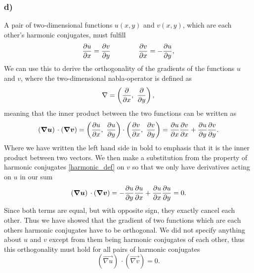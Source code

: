 \documentclass[12pt,twoside]{article}
\begin{document}
\subsubsection*{d)}
A pair of two-dimensional functions $u(x, y)$ and $v(x, y)$, which are each other's harmonic conjugates, must fulfill
\begin{equation}
  \pdv{u}{x} = \pdv{v}{y} \qquad \qquad \pdv{v}{x} = - \pdv{u}{y}, \label{harmonic_def}
\end{equation}
We can use this to derive the orthogonality of the gradients of the functions $u$ and $v$, where the two-dimensional nabla-operator is defined as
\begin{equation}
  \nabla = \left( \pdv{}{x}, \,\, \pdv{}{y} \right),
\end{equation}
meaning that the inner product between the two functions can be written as
\begin{equation}
  \left( {\boldsymbol{{ \nabla u}}} \right) \,\cdot   \left( {\boldsymbol{{ \nabla v}}} \right) = \left( \pdv{u}{x}, \,\, \pdv{u}{y} \right)\cdot \left( \pdv{v}{x}, \,\, \pdv{v}{y} \right) = \pdv{u}{x}\pdv{v}{x} + \pdv{u}{y}\pdv{v}{y}.
\end{equation}
Where we have written the left hand side in bold to emphasis that it is the inner product between two vectors. We then make a substitution from the property of harmonic conjugates \eqref{harmonic_def} on $v$ so that we only have derivatives acting on $u$ in our sum
\begin{equation}
  \left( {\boldsymbol{{ \nabla u}}} \right) \,\cdot   \left( {\boldsymbol{{ \nabla v}}} \right) = -\pdv{u}{y}\pdv{u}{x} + \pdv{u}{x}\pdv{u}{y} = 0.
\end{equation}
Since both terms are equal, but with opposite sign, they exactly cancel each other. Thus we have showed that the gradient of two functions which are each others harmonic conjugates have to be orthogonal. We did not specify anything about $u$ and $v$ except from them being harmonic conjugates of each other, thus this orthogonality must hold for all pairs of harmonic conjugates
\begin{equation}
  \left( \vec{ \nabla u} \right) \,\cdot   \left( \vec{ \nabla v} \right) = 0. \label{ortogonality_harmo}
\end{equation}
\end{document}
